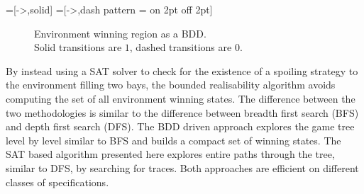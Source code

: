 =[->,solid]
=[->,dash pattern = on 2pt off 2pt]
\begin{figure}
    \centering
    \captionsetup{justification=centering}
    \caption[Environment winning region as a BDD]{Environment winning region as a BDD.\\Solid transitions are $1$, dashed transitions are $0$.}
    \label{fig:strengthsexamplebdd}
\end{figure}

By instead using a SAT solver to check for the existence of a spoiling strategy to the environment filling two bays, the bounded realisability algorithm avoids computing the set of all environment winning states. The difference between the two methodologies is similar to the difference between breadth first search (BFS) and depth first search (DFS). The BDD driven approach explores the game tree level by level similar to BFS and builds a compact set of winning states. The SAT based algorithm presented here explores entire paths through the tree, similar to DFS, by searching for traces. Both approaches are efficient on different classes of specifications.

